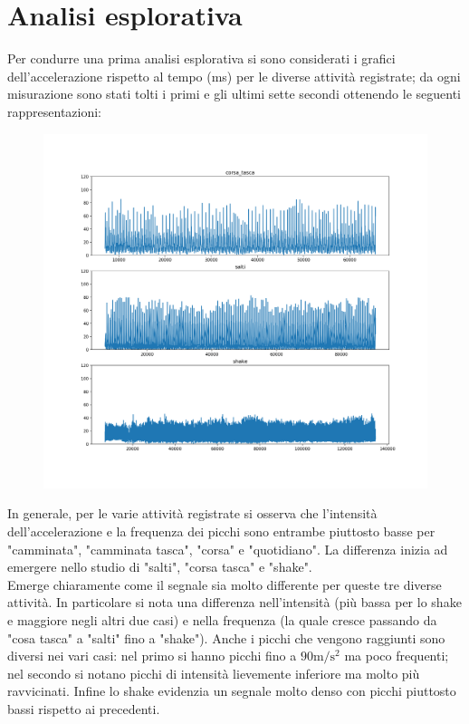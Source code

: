 \documentclass[./main.tex]{subfiles}
\begin{document}
\section{Analisi esplorativa}
Per condurre una prima analisi esplorativa si sono considerati i grafici dell'accelerazione rispetto al tempo (ms) per le diverse attività registrate; da ogni misurazione sono stati tolti i primi e gli ultimi sette secondi ottenendo le seguenti rappresentazioni:
\begin{figure}[H]
	\centering
	\includegraphics[width=.8\textwidth, keepaspectratio]{../../figure/espl.png}
	\caption{{}}
	\label{espl}
\end{figure}
In generale, per le varie attività registrate si osserva che l'intensità dell'accelerazione e la frequenza dei picchi sono entrambe piuttosto basse per "camminata", "camminata tasca", "corsa" e "quotidiano". La differenza inizia ad emergere nello studio di "salti", "corsa tasca" e "shake".
\\
Emerge chiaramente come il segnale sia molto differente per queste tre diverse attività. In particolare si nota
una differenza nell'intensità (più bassa per lo shake e maggiore negli altri due casi) e nella frequenza (la quale cresce passando da "cosa tasca" a "salti" fino a "shake"). Anche i picchi che vengono raggiunti sono diversi nei vari casi: nel primo si hanno picchi fino a $90\si{\metre\per\square\second}$ ma poco frequenti; nel secondo si notano picchi di intensità lievemente inferiore ma molto più ravvicinati. Infine lo shake evidenzia un segnale molto denso con  picchi piuttosto bassi rispetto ai precedenti. 
\\
\end{document}
